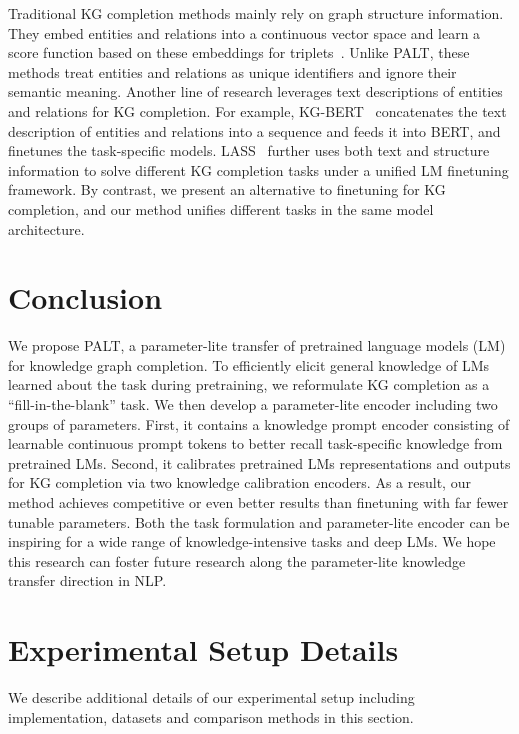 \documentclass[11pt]{article}
\newcommand{\method}{\textsc{PALT}}
\newcommand{\calibration}{knowledge calibration encoder}
\begin{document}
Traditional KG completion methods mainly rely on graph structure information. They embed entities and relations into a continuous vector space and learn a score function based on these embeddings for triplets~\cite{TransE, TransH, TransR, Rescal, Tucker, ConvE, ConvKB, cai_kbgan:_2018}. Unlike \method, these methods treat entities and relations as unique identifiers and ignore their semantic meaning. Another line of research leverages text descriptions of entities and relations for KG completion. For example, KG-BERT~\cite{KGBERT} concatenates the text description of entities and relations into a sequence and feeds it into BERT, and finetunes the task-specific models. LASS~\cite{lass} further uses both text and structure information to solve different KG completion tasks under a unified LM finetuning framework. By contrast, we present an alternative to finetuning for KG completion, and our method unifies different tasks in the same model architecture. \section{Conclusion}
We propose \method, a parameter-lite transfer of pretrained language models (LM) for knowledge graph completion. To efficiently elicit general knowledge of LMs learned about the task during pretraining, we reformulate KG completion as a ``fill-in-the-blank'' task. We then develop a parameter-lite encoder including two groups of parameters. First, it contains a knowledge prompt encoder consisting of learnable continuous prompt tokens to better recall task-specific knowledge from pretrained LMs. Second, it calibrates pretrained LMs representations and outputs for KG completion via two \calibration s. As a result, our method achieves competitive or even better results than finetuning with far fewer tunable parameters. Both the task formulation and parameter-lite encoder can be inspiring for a wide range of knowledge-intensive tasks and deep LMs. We hope this research can foster future research along the parameter-lite knowledge transfer direction in NLP.

 




\appendix
\section{Experimental Setup Details}
\label{appendix:exp}
We describe additional details of our experimental setup including implementation, datasets and comparison methods in this section.
\end{document}
